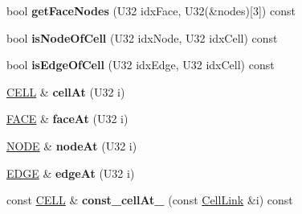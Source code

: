 \begin{DoxyCompactItemize}
\item 
\hypertarget{classps_1_1elastic_1_1VolMesh_ac7d3a6447c0c5eba8dcd829139bbc5f3}{}bool {\bfseries get\+Face\+Nodes} (U32 idx\+Face, U32(\&nodes)\mbox{[}3\mbox{]}) const \label{classps_1_1elastic_1_1VolMesh_ac7d3a6447c0c5eba8dcd829139bbc5f3}

\item 
\hypertarget{classps_1_1elastic_1_1VolMesh_a2cd4059bf1f21093e860e54fddb2d774}{}bool {\bfseries is\+Node\+Of\+Cell} (U32 idx\+Node, U32 idx\+Cell) const \label{classps_1_1elastic_1_1VolMesh_a2cd4059bf1f21093e860e54fddb2d774}

\item 
\hypertarget{classps_1_1elastic_1_1VolMesh_adf5932ab9ad4eeb93efb67d7b9f88fd4}{}bool {\bfseries is\+Edge\+Of\+Cell} (U32 idx\+Edge, U32 idx\+Cell) const \label{classps_1_1elastic_1_1VolMesh_adf5932ab9ad4eeb93efb67d7b9f88fd4}

\item 
\hypertarget{classps_1_1elastic_1_1VolMesh_a7d6a48de77e1687a75a2eab90b14437b}{}\hyperlink{classps_1_1elastic_1_1CELL}{C\+E\+L\+L} \& {\bfseries cell\+At} (U32 i)\label{classps_1_1elastic_1_1VolMesh_a7d6a48de77e1687a75a2eab90b14437b}

\item 
\hypertarget{classps_1_1elastic_1_1VolMesh_a7376563ee2f5887b9abe72a6afc2a188}{}\hyperlink{classps_1_1elastic_1_1FACE}{F\+A\+C\+E} \& {\bfseries face\+At} (U32 i)\label{classps_1_1elastic_1_1VolMesh_a7376563ee2f5887b9abe72a6afc2a188}

\item 
\hypertarget{classps_1_1elastic_1_1VolMesh_aeefd7f308c72b311d72c90b9e727a881}{}\hyperlink{classps_1_1elastic_1_1NODE}{N\+O\+D\+E} \& {\bfseries node\+At} (U32 i)\label{classps_1_1elastic_1_1VolMesh_aeefd7f308c72b311d72c90b9e727a881}

\item 
\hypertarget{classps_1_1elastic_1_1VolMesh_a21aadad5b2eb050b15f7b888cd577a00}{}\hyperlink{classps_1_1elastic_1_1EDGE}{E\+D\+G\+E} \& {\bfseries edge\+At} (U32 i)\label{classps_1_1elastic_1_1VolMesh_a21aadad5b2eb050b15f7b888cd577a00}

\item 
\hypertarget{classps_1_1elastic_1_1VolMesh_a8137affa13e3d75ed81c4045ae217b46}{}const \hyperlink{classps_1_1elastic_1_1CELL}{C\+E\+L\+L} \& {\bfseries const\+\_\+cell\+At\+\_\+} (const \hyperlink{classps_1_1elastic_1_1CellLink}{Cell\+Link} \&i) const \label{classps_1_1elastic_1_1VolMesh_a8137affa13e3d75ed81c4045ae217b46}


\end{DoxyCompactItemize}
